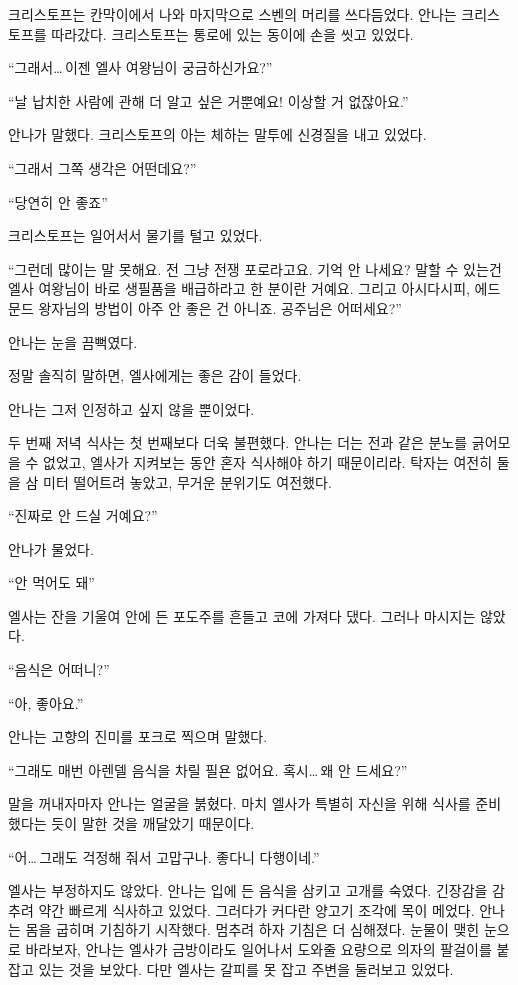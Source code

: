 크리스토프는 칸막이에서 나와 마지막으로 스벤의 머리를 쓰다듬었다. 안나는 크리스토프를 따라갔다. 크리스토프는 통로에 있는 동이에 손을 씻고 있었다.

``그래서\ldots\,이젠 엘사 여왕님이 궁금하신가요?''

``날 납치한 사람에 관해 더 알고 싶은 거뿐예요! 이상할 거 없잖아요.''

안나가 말했다. 크리스토프의 아는 체하는 말투에 신경질을 내고 있었다.

``그래서 그쪽 생각은 어떤데요?''

``당연히 안 좋죠''

크리스토프는 일어서서 물기를 털고 있었다.

``그런데 많이는 말 못해요. 전 그냥 전쟁 포로라고요. 기억 안 나세요? 말할 수 있는건 엘사 여왕님이 바로 생필품을 배급하라고 한 분이란 거예요. 그리고 아시다시피, 에드문드 왕자님의 방법이 아주 안 좋은 건 아니죠. 공주님은 어떠세요?''

안나는 눈을 끔뻑였다.

정말 솔직히 말하면, 엘사에게는 좋은 감이 들었다.

안나는 그저 인정하고 싶지 않을 뿐이었다.

\textbreak

두 번째 저녁 식사는 첫 번째보다 더욱 불편했다. 안나는 더는 전과 같은 분노를 긁어모을 수 없었고, 엘사가 지켜보는 동안 혼자 식사해야 하기 때문이리라. 탁자는 여전히 둘을 삼 미터 떨어트려 놓았고, 무거운 분위기도 여전했다.

``진짜로 안 드실 거예요?''

안나가 물었다.

``안 먹어도 돼''

엘사는 잔을 기울여 안에 든 포도주를 흔들고 코에 가져다 댔다. 그러나 마시지는 않았다.

``음식은 어떠니?''

``아, 좋아요.''

안나는 고향의 진미를 포크로 찍으며 말했다.

``그래도 매번 아렌델 음식을 차릴 필욘 없어요. 혹시\ldots\,왜 안 드세요?''

말을 꺼내자마자 안나는 얼굴을 붉혔다. 마치 엘사가 특별히 자신을 위해 식사를 준비했다는 듯이 말한 것을 깨달았기 때문이다.

``어\ldots\,그래도 걱정해 줘서 고맙구나. 좋다니 다행이네.''

엘사는 부정하지도 않았다. 안나는 입에 든 음식을 삼키고 고개를 숙였다. 긴장감을 감추려 약간 빠르게 식사하고 있었다. 그러다가 커다란 양고기 조각에 목이 메었다. 안나는 몸을 굽히며 기침하기 시작했다. 멈추려 하자 기침은 더 심해졌다. 눈물이 맺힌 눈으로 바라보자, 안나는 엘사가 금방이라도 일어나서 도와줄 요량으로 의자의 팔걸이를 붙잡고 있는 것을 보았다. 다만 엘사는 갈피를 못 잡고 주변을 둘러보고 있었다.

